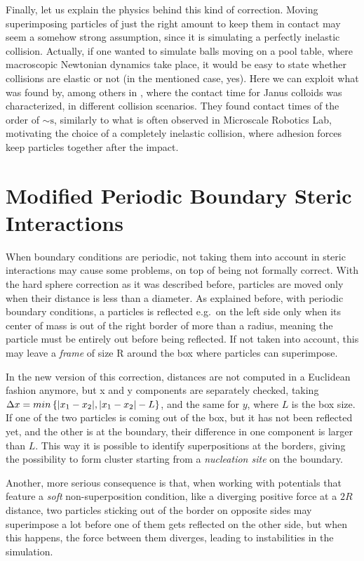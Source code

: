 \documentclass[../../master_thesis_np.tex]{subfiles}
\begin{document}
	Finally, let us explain the physics behind this kind of correction. Moving superimposing particles of just the right amount to keep them in contact may seem a somehow strong assumption, since it is simulating a perfectly inelastic collision. Actually, if one wanted to simulate balls moving on a pool table, where macroscopic Newtonian dynamics take place, it would be easy to state whether collisions are elastic or not (in the mentioned case, yes). Here we can exploit what was found by, among others \citeauthor{singh_pair_2024} in \cite{singh_pair_2024}, where the contact time for Janus colloids was characterized, in different collision scenarios. They found contact times of the order of $\sim \text{s}$, similarly to what is often observed in Microscale Robotics Lab, motivating the choice of a completely inelastic collision, where adhesion forces keep particles together after the impact. 

	\section{Modified Periodic Boundary Steric Interactions}
	When boundary conditions are periodic, not taking them into account in steric interactions may cause some problems, on top of being not formally correct. With the hard sphere correction as it was described before, particles are moved only when their distance is less than a diameter. As explained before, with periodic boundary conditions, a particles is reflected e.g.~on the left side only when its center of mass is out of the right border of more than a radius, meaning the particle must be entirely out before being reflected. If not taken into account, this may leave a \emph{frame} of size R around the box where particles can superimpose. 
	
	In the new version of this correction, distances are not computed in a Euclidean fashion anymore, but x and y components are separately checked, taking $\Delta x = min \left\{ \abs{x_1-x_2}, \abs{x_1-x_2}-L \right\}$, and the same for $y$, where $L$ is the box size. If one of the two particles is coming out of the box, but it has not been reflected yet, and the other is at the boundary, their difference in one component is larger than $L$. This way it is possible to identify superpositions at the borders, giving the possibility to form cluster starting from a \emph{nucleation site} on the boundary. 
	
	Another, more serious consequence is that, when working with potentials that feature a \emph{soft} non-superposition condition, like a diverging positive force at a $2R$ distance, two particles sticking out of the border on opposite sides may superimpose a lot before one of them gets reflected on the other side, but when this happens, the force between them diverges, leading to instabilities in the simulation.
	
\end{document}
